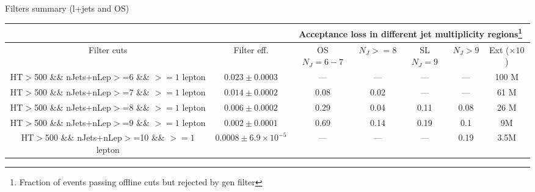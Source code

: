 \documentclass{beamer}
\begin{document}
\begin{frame}{Filters summary  (l+jets and OS)}
\begin{center}
{\tiny \begin{tabular}{|c|c|c|c|c|c|c|}
            \cline{1-7}
             & & \multicolumn{5}{|c|}{Acceptance loss in different jet multiplicity regions\footnote{Fraction of events passing offline cuts but rejected by gen filter}}\\
            \cline{1-7}
\hline Filter cuts & Filter eff. & OS $N_J=6-7$& $N_J>=8$ & SL $N_J=9$& $N_J>9$& Ext ($\times 10$) \\ 
\hline \thead{{\tiny HT$>$500} \\ {\tiny \&\&  nJets+nLep$>$=6} \\ {\tiny \&\& $>=1$ lepton}} & $0.023 \pm 0.0003$  & --- & --- & --- & --- & 100 M\\
\hline \thead{{\tiny HT$>$500} \\ {\tiny \&\&  nJets+nLep$>$=7} \\ {\tiny \&\& $>=1$ lepton}} & $0.014 \pm 0.0002$  & 0.08 & 0.02 & --- & --- & 61 M\\
\hline \thead{{\tiny HT$>$500} \\{\tiny \&\& nJets+nLep$>$=8} \\ {\tiny \&\& $>=1$ lepton}} & $0.006 \pm 0.0002$  & 0.29 & 0.04 & 0.11 & 0.08 & 26 M\\ 
\hline \thead{{\tiny HT$>$500} \\ {\tiny \&\& nJets+nLep$>$=9} \\ {\tiny \&\& $>=1$ lepton}} & $0.002 \pm 0.0001$   & 0.69 & 0.14 & 0.19 & 0.1 & 9M\\ 
\hline \thead{{\tiny HT$>$500} \\ {\tiny \&\& nJets+nLep$>$=10} \\ {\tiny \&\& $>=1$ lepton}} & $0.0008 \pm 6.9\times 10^{-5}$   & --- & --- & --- & 0.19 & 3.5M\\
\hline 
\end{tabular} }
\end{center}
\end{frame}
\end{document}
